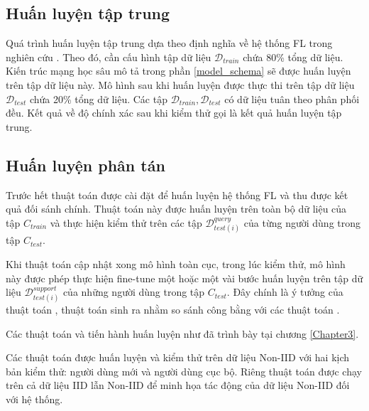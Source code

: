 \subsection{Huấn luyện tập trung}

Quá trình huấn luyện tập trung dựa theo định nghĩa về hệ thống FL trong nghiên cứu \cite{yin2021comprehensive}. Theo đó, cần cấu hình tập dữ liệu $\mathcal{D}_{train}$ chứa 80\% tổng dữ liệu. Kiến trúc mạng học sâu mô tả trong phần \ref{model_schema} sẽ được huấn luyện trên tập dữ liệu này. Mô hình sau khi huấn luyện được thực thi trên tập dữ liệu $\mathcal{D}_{test}$ chứa 20\% tổng dữ liệu. Các tập $\mathcal{D}_{train}, \mathcal{D}_{test}$ có dữ liệu tuân theo phân phối đều. Kết quả về độ chính xác sau khi kiểm thử gọi là kết quả huấn luyện tập trung.

\subsection{Huấn luyện phân tán}

Trước hết thuật toán  được cài đặt để huấn luyện hệ thống FL và thu được kết quả đối sánh chính. Thuật toán này được huấn luyện trên toàn bộ dữ liệu của tập $C_{train}$ và thực hiện kiểm thử trên các tập $\mathcal{D}_{test(i)}^{query}$ của từng người dùng trong tập $C_{test}$.

Khi thuật toán  cập nhật xong mô hình toàn cục, trong lúc kiểm thử, mô hình này được phép thực hiện fine-tune một hoặc một vài bước huấn luyện trên tập dữ liệu $\mathcal{D}_{test(i)}^{support}$ của những người dùng trong tập $C_{test}$. Đây chính là ý tưởng của thuật toán , thuật toán sinh ra nhằm so sánh công bằng với các thuật toán .

Các thuật toán  và  tiến hành huấn luyện như đã trình bày tại chương \ref{Chapter3}.


Các thuật toán được huấn luyện và kiểm thử trên dữ liệu Non-IID với hai kịch bản kiểm thử: người dùng mới và người dùng cục bộ. Riêng thuật toán  được chạy trên cả dữ liệu IID lẫn Non-IID để minh họa tác động của dữ liệu Non-IID đối với hệ thống.

